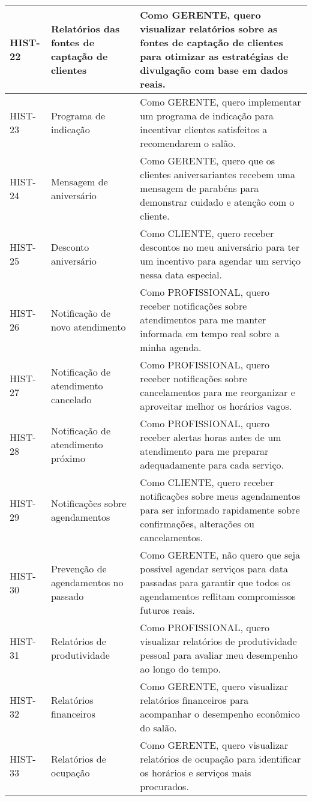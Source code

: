 \begin{longtable}{|p{2cm}|p{4cm}|p{9cm}|}
	HIST-22 & Relatórios das fontes de captação de clientes & Como GERENTE, quero visualizar relatórios sobre as fontes de captação de clientes para otimizar as estratégias de divulgação com base em dados reais. \\ \hline
	HIST-23 & Programa de indicação & Como GERENTE, quero implementar um programa de indicação para incentivar clientes satisfeitos a recomendarem o salão. \\ \hline
	HIST-24 & Mensagem de aniversário & Como GERENTE, quero que os clientes aniversariantes recebem uma mensagem de parabéns para demonstrar cuidado e atenção com o cliente. \\ \hline
	HIST-25 & Desconto aniversário & Como CLIENTE, quero receber descontos no meu aniversário para ter um incentivo para agendar um serviço nessa data especial. \\ \hline
	HIST-26 & Notificação de novo atendimento & Como PROFISSIONAL, quero receber notificações sobre atendimentos para me manter informada em tempo real sobre a minha agenda. \\ \hline
	HIST-27 & Notificação de atendimento cancelado & Como PROFISSIONAL, quero receber notificações sobre cancelamentos para me reorganizar e aproveitar melhor os horários vagos. \\ \hline
	HIST-28 & Notificação de atendimento próximo & Como PROFISSIONAL, quero receber alertas horas antes de um atendimento para me preparar adequadamente para cada serviço. \\ \hline
	HIST-29 & Notificações sobre agendamentos & Como CLIENTE, quero receber notificações sobre meus agendamentos para ser informado rapidamente sobre confirmações, alterações ou cancelamentos. \\ \hline
	HIST-30 & Prevenção de agendamentos no passado & Como GERENTE, não quero que seja possível agendar serviços para data passadas para garantir que todos os agendamentos reflitam compromissos futuros reais. \\ \hline
	HIST-31 & Relatórios de produtividade & Como PROFISSIONAL, quero visualizar relatórios de produtividade pessoal para avaliar meu desempenho ao longo do tempo. \\ \hline
	HIST-32 & Relatórios financeiros & Como GERENTE, quero visualizar relatórios financeiros  para acompanhar o desempenho econômico do salão. \\ \hline
	HIST-33 & Relatórios de ocupação & Como GERENTE, quero visualizar relatórios de ocupação para identificar os horários e serviços mais procurados. \\ \hline

\end{longtable}
